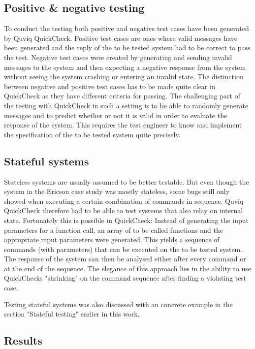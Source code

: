 \documentclass[a4paper, 12pt]{article} %
\begin{document}
\subsection{Positive \& negative testing}

To conduct the testing both positive and negative test cases have been generated by Quviq QuickCheck. Positive test cases are ones where valid messages have been generated and the reply of the to be tested system had to be correct to pass the test. Negative test cases were created by generating and sending invalid messages to the system and then expecting a negative response from the system without seeing the system crashing or entering an invalid state. The distinction between negative and positive test cases has to be made quite clear in QuickCheck as they have different criteria for passing. The challenging part of the testing with QuickCheck in such a setting is to be able to randomly generate messages and to predict whether or not it is valid in order to evaluate the response of the system. This requires the test engineer to know and implement the specification of the to be tested system quite precisely. \cite{Arts06}

\subsection{Stateful systems}

Stateless systems are usually assumed to be better testable. But even though the system in the Ericson case study was mostly stateless, some bugs still only showed when executing a certain combination of commands in sequence. Quviq QuickCheck therefore had to be able to test systems that also relay on internal state. Fortunately this is possible in QuickCheck: Instead of generating the input parameters for a function call, an array of to be called functions and the appropriate input parameters were generated. This yields a sequence of commands (with parameters) that can be executed on the to be tested system. The response of the system can then be analysed either after every command or at the end of the sequence. The elegance of this approach lies in the ability to use QuickChecks "shrinking" on the command sequence after finding a violating test case. \cite{Arts06} 

Testing stateful systems was also discussed with an concrete example in the section "Stateful testing" earlier in this work.

\subsection{Results}
\end{document}
